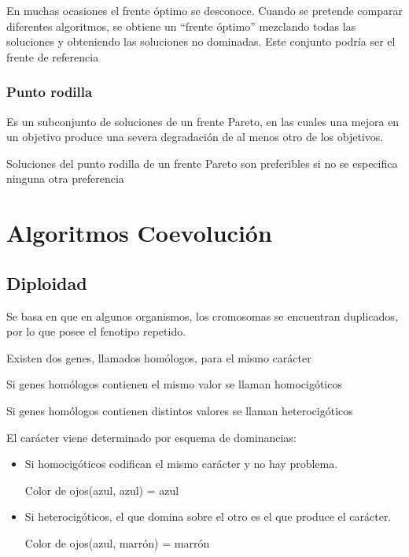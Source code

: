 \documentclass[12pt, twoside, openright]{report} %
\begin{document}
En muchas ocasiones el frente óptimo se desconoce. Cuando se pretende comparar diferentes algoritmos, se obtiene un “frente óptimo” mezclando todas las soluciones y obteniendo las soluciones no dominadas. Este conjunto podría ser el frente de referencia

\subsubsection{Punto rodilla}
Es un subconjunto de soluciones de un frente Pareto, en las cuales una mejora en un objetivo produce una severa degradación de al menos otro de los objetivos.

Soluciones del punto rodilla de un frente Pareto son preferibles si no se especifica ninguna otra preferencia

\section{Algoritmos Coevolución}
\subsection{Diploidad}
Se basa en que en algunos organismos, los cromosomas se encuentran duplicados, por lo que posee el fenotipo repetido.

Existen dos genes, llamados homólogos, para el mismo carácter

Si genes homólogos contienen el mismo valor se llaman homocigóticos

Si genes homólogos contienen distintos valores se llaman heterocigóticos

El carácter viene determinado por esquema de dominancias:
\begin{itemize}
	\item Si homocigóticos codifican el mismo carácter y no hay problema. 
	
	Color de ojos(azul, azul) = azul
	\item Si heterocigóticos, el que domina sobre el otro es el que produce el carácter. 
	
	Color de ojos(azul, marrón) = marrón
\end{itemize}
\end{document}
